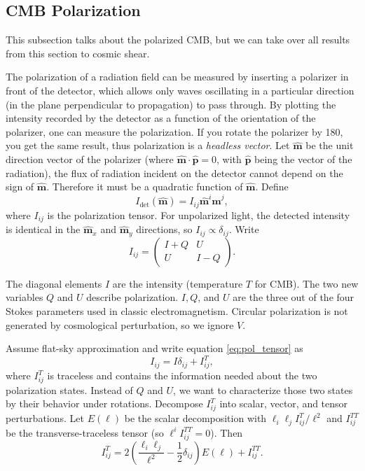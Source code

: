 \subsection{CMB Polarization}

This subsection talks about the polarized CMB, but we can take over all results from this section to cosmic shear.

The polarization of a radiation field can be measured by inserting a polarizer in front of the detector, which allows only waves oscillating in a particular direction (in the plane perpendicular to propagation) to pass through. By plotting the intensity recorded by the detector as a function of the orientation of the polarizer, one can measure the polarization. If you rotate the polarizer by 180\textdegree, you get the same result, thus polarization is a \textit{headless vector}. Let $\bm{\hat{m}}$ be the unit direction vector of the polarizer (where $\bm{\hat{m}} \cdot \bm{\hat{p}} = 0$, with $\bm{\hat{p}}$ being the vector of the radiation), the flux of radiation incident on the detector cannot depend on the sign of $\bm{\hat{m}}$. Therefore it must be a quadratic function of $\bm{\hat{m}}$. Define
\begin{equation}
    \label{eq:pol_inten}
    I_\text{det}(\bm{\hat{m}}) = I_{ij}\bm{\hat{m}}^i\bm{\hat{m}}^j,
\end{equation}
where $I_{ij}$ is the polarization tensor. For unpolarized light, the detected intensity is identical in the $\bm{\hat{m}}_x$ and $\bm{\hat{m}}_y$ directions, so $I_{ij} \propto \delta_{ij}$. Write
\begin{equation}
    \label{eq:pol_tensor}
    I_{ij} = \begin{pmatrix}
        I + Q & U \\
        U & I - Q
    \end{pmatrix}.
\end{equation}

The diagonal elements $I$ are the intensity (temperature $T$ for CMB). The two new variables $Q$ and $U$ describe polarization. $I, Q$, and $U$ are the three out of the four Stokes parameters used in classic electromagnetism. Circular polarization is not generated by cosmological perturbation, so we ignore $V$.

Assume flat-sky approximation and write equation \ref{eq:pol_tensor} as
\begin{equation}
    \label{eq:pol_tensor2}
    I_{ij} = I\delta_{ij} + I^T_{ij},
\end{equation}
where $I^T_{ij}$ is traceless and contains the information needed about the two polarization states. Instead of $Q$ and $U$, we want to characterize those two states by their behavior under rotations. Decompose $I^T_{ij}$ into scalar, vector, and tensor perturbations. Let $E(\bm{\ell})$ be the scalar decomposition with $\ell_i\ell_jI^T_{ij}/\ell^2$ and $I^{TT}_{ij}$ be the transverse-traceless tensor (so $\ell^iI^{TT}_{ij}=0$). Then
\begin{equation}
    \label{eq:pol_tensor3}
    I^T_{ij} = 2 \left(\frac{\ell_i \ell_j}{\ell^2} - \frac{1}{2}\delta_{ij}\right)E(\bm{\ell}) + I^{TT}_{ij}.
\end{equation}

